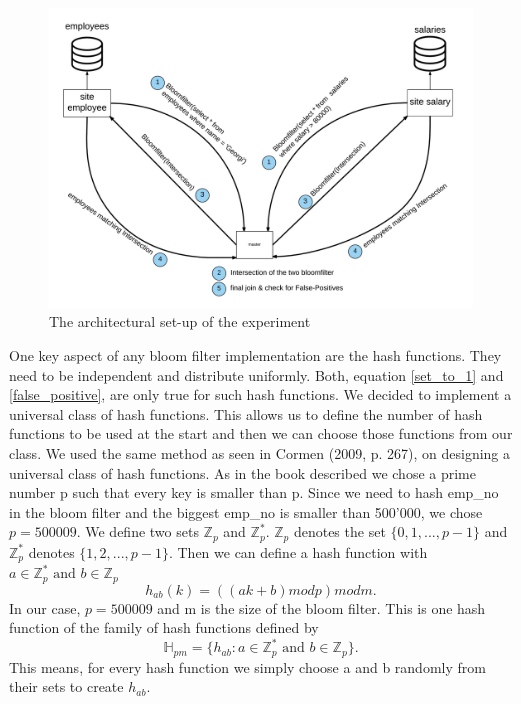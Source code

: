 \documentclass[12]{scrartcl}
\begin{document}
\begin{figure}[ht]
	\begin{center}
		\includegraphics[scale=0.1]{res/architecture.png}
	\end{center}
	\caption{The architectural set-up of the experiment}
	\label{fig:architecture}
\end{figure}





One key aspect of any bloom filter implementation are the hash functions. They need to be independent and distribute uniformly. Both, equation \ref{set_to_1} and \ref{false_positive}, are only true for such hash functions. We decided to implement a universal class of hash functions. This allows us to define the number of hash functions to be used at the start and then we can choose those functions from our class. We used the same method as seen in Cormen (2009, p. 267), on designing a universal class of hash functions. As in the book described we chose a prime number p such that every key is smaller than p. Since we need to hash emp\_no in the bloom filter and the biggest emp\_no is smaller than 500'000, we chose $p = 500009$. We define two sets $\mathbb{Z}_p$ and $\mathbb{Z}_p^*$. $\mathbb{Z}_p$ denotes the set $\{0,1,...,p-1\}$ and $\mathbb{Z}_p^*$ denotes $\{1,2,...,p-1\}$. Then we can define a hash function with $a \in \mathbb{Z}_p^* \text{ and } b \in \mathbb{Z}_p$
\begin{equation}
	h_{ab}(k) = ((ak + b) \mathrel{mod} p) \mathrel{mod} m.
\end{equation}
In our case, $p = 500009$ and m is the size of the bloom filter. This is one hash function of the family of hash functions defined by
\begin{equation}
\mathbb{H}_{pm} = \{h_{ab} \mathrel{:} a \in \mathbb{Z}_p^* \text{ and } b \in \mathbb{Z}_p\}.
\end{equation}
This means, for every hash function we simply choose a and b randomly from their sets to create $h_{ab}$.\\\\
\end{document}
